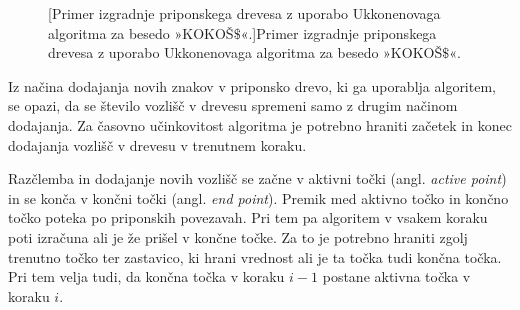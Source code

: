 \begin{figure}[htb]
\begin{subfigure}[t]{0.3\linewidth}
        
        \centering
        \label{fig:Ukkonen1}
    \end{subfigure}
    \hspace{0.5cm}
    \begin{subfigure}[t]{0.3\linewidth}
        
        \centering
        \label{fig:Ukkonen2}
    \end{subfigure}
    \hspace{0.5cm}
    \begin{subfigure}[t]{0.3\linewidth}
        
        \centering
        \label{fig:Ukkonen3}
    \end{subfigure}
    \par\bigskip 
    \begin{subfigure}[t]{0.3\linewidth}
        
        \centering
        \label{fig:Ukkonen4}
    \end{subfigure}
    \hspace{0.5cm}
    \begin{subfigure}[t]{0.3\linewidth}
        
        \centering
        \label{fig:Ukkonen5}
    \end{subfigure}
    \hspace{0.5cm}
    \begin{subfigure}[t]{0.3\textwidth}
        
        \centering
        \label{fig:Ukkonen6}
    \end{subfigure}

       [Primer izgradnje priponskega drevesa z uporabo Ukkonenovaga algoritma za besedo »KOKOŠ$\$$«.]{Primer izgradnje priponskega drevesa z uporabo Ukkonenovaga algoritma za besedo »KOKOŠ$\$$«.} 
        \label{fig:Ukkonen}
\end{figure}

Iz načina dodajanja novih znakov v priponsko drevo, ki ga uporablja algoritem, se opazi, da se število vozlišč v drevesu spremeni samo z drugim načinom dodajanja. Za časovno učinkovitost algoritma je potrebno hraniti začetek in konec dodajanja vozlišč v drevesu v trenutnem koraku.

Razčlemba in dodajanje novih vozlišč se začne v aktivni točki (angl. \textit{active point}) in se konča v končni točki (angl. \textit{end point}). Premik med aktivno točko in končno točko poteka po priponskih povezavah. Pri tem pa algoritem v vsakem koraku poti izračuna ali je že prišel v končne točke. Za to je potrebno hraniti zgolj trenutno točko ter zastavico, ki hrani vrednost ali je ta točka tudi končna točka. Pri tem velja tudi, da končna točka v koraku $i-1$ postane aktivna točka v koraku $i$. 

